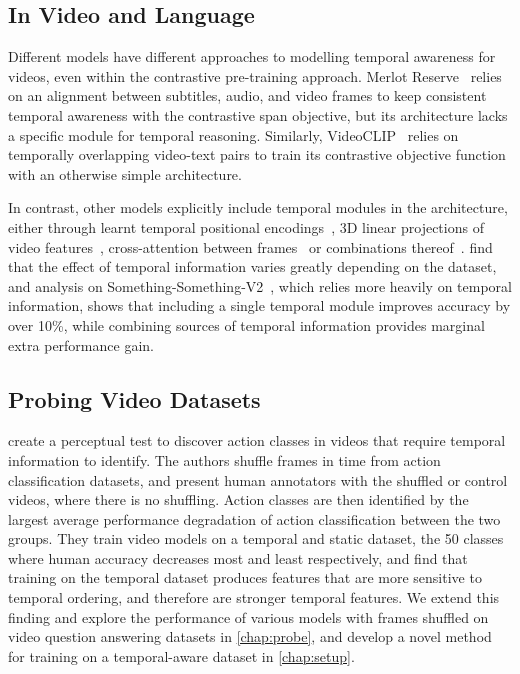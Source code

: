 
\subsection{In Video and Language}
\label{ssec:tempvidlm}

Different models have different approaches to modelling temporal awareness for
videos, even within the contrastive pre-training approach. Merlot
Reserve~\citep{zellers2022mreserve} relies on an alignment between subtitles,
audio, and video frames to keep consistent temporal awareness with the
contrastive span objective, but its architecture lacks a specific module for
temporal reasoning. Similarly, VideoCLIP~\citep{xu2021videoclip} relies on
temporally overlapping video-text pairs to train its contrastive objective
function with an otherwise simple architecture.

In contrast, other models explicitly include temporal modules in the
architecture, either through learnt temporal positional
encodings~\citep{alayrac2022flamingo}, 3D linear projections of video
features~\citep{luo2022clip4clip}, cross-attention between
frames~\citep{li2023lavender} or combinations
thereof~\citep{lin2022evl,bain2021frozen}. \citet{lin2022evl} find that the
effect of temporal information varies greatly depending on the dataset, and
analysis on Something-Something-V2~\citep{goyal2017something}, which relies
more heavily on temporal information, shows that including a single temporal
module improves accuracy by over 10\%, while combining sources of temporal
information provides marginal extra performance gain.

\subsection{Probing Video Datasets}
\label{ssec:tempprobes}
\citet{sevilla-lara2021temporal} create a perceptual test to discover action
classes in videos that require temporal information to identify. The authors
shuffle frames in time from action classification datasets, and present human
annotators with the shuffled or control videos, where there is no shuffling.
Action classes are then identified by the largest average performance
degradation of action classification between the two groups. They train video
models on a temporal and static dataset, the 50 classes where human accuracy
decreases most and least respectively, and find that training on the temporal
dataset produces features that are more sensitive to temporal ordering, and
therefore are stronger temporal features.
We extend this finding and explore the performance of various models with
frames shuffled on video question answering datasets in \cref{chap:probe}, and
develop a novel method for training  on a temporal-aware
dataset in \cref{chap:setup}.

